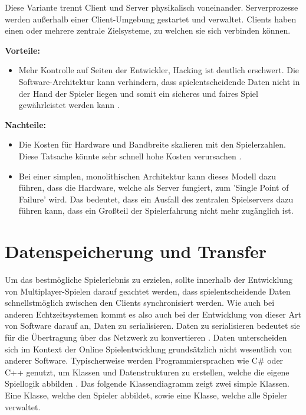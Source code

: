 Diese Variante trennt Client und Server physikalisch voneinander. Serverprozesse werden außerhalb einer Client-Umgebung gestartet und verwaltet. Clients haben einen oder mehrere zentrale Zielsysteme, zu welchen sie sich verbinden können.

\textbf{Vorteile:}
\begin{itemize}
	\item Mehr Kontrolle auf Seiten der Entwickler, Hacking ist deutlich erschwert. Die Software-Architektur kann verhindern, dass spielentscheidende Daten nicht in der Hand der Spieler liegen und somit ein sicheres und faires Spiel gewährleistet werden kann \cite{Smed.2002}. 
\end{itemize}

\textbf{Nachteile:}
\begin{itemize}
	\item Die Kosten für Hardware und Bandbreite skalieren mit den Spielerzahlen. Diese Tatsache könnte sehr schnell hohe Kosten verursachen \cite{Deng.2018}. 
	\item Bei einer simplen, monolithischen Architektur kann dieses Modell dazu führen, dass die Hardware, welche als Server fungiert, zum 'Single Point of Failure' wird. Das bedeutet, dass ein Ausfall des zentralen Spielservers dazu führen kann, dass ein Großteil der Spielerfahrung nicht mehr zugänglich ist.
\end{itemize}

\section{Datenspeicherung und Transfer}

Um das bestmögliche Spielerlebnis zu erzielen, sollte innerhalb der Entwicklung von Multiplayer-Spielen darauf geachtet werden, dass spielentscheidende Daten schnellstmöglich zwischen den Clients synchronisiert werden. Wie auch bei anderen Echtzeitsystemen kommt es also auch bei der Entwicklung von dieser Art von Software darauf an, Daten zu serialisieren. Daten zu serialisieren bedeutet sie für die Übertragung über das Netzwerk zu konvertieren \cite{Wikipedia.2019}. Daten unterscheiden sich im Kontext der Online Spielentwicklung grundsätzlich nicht wesentlich von anderer Software. Typischerweise werden Programmiersprachen wie C\# oder C++ genutzt, um Klassen und Datenstrukturen zu erstellen, welche die eigene Spiellogik abbilden \cite{Glinka.2008}.  Das folgende Klassendiagramm zeigt zwei simple Klassen. Eine Klasse, welche den Spieler abbildet, sowie eine Klasse, welche alle Spieler verwaltet.

